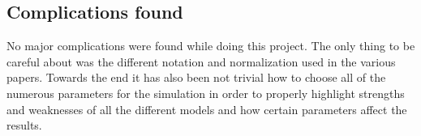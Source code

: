 \subsection{Complications found} %
\label{subsec:complications}

No major complications were found while doing this project. The only thing to be careful about was the different notation and normalization used in the various papers. Towards the end it has also been not trivial how to choose all of the numerous parameters for the simulation in order to properly highlight strengths and weaknesses of all the different models and how certain parameters affect the results.
